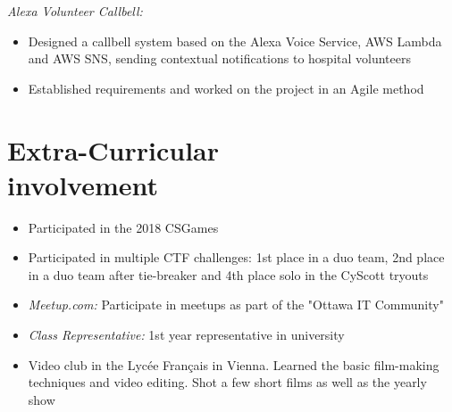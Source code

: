 \documentclass[margin, 10pt]{res} %
\begin{document}
\begin{resume}
{\sl Alexa Volunteer Callbell:}
\begin{itemize} \itemsep -2pt
\item Designed a callbell system based on the Alexa Voice Service, AWS Lambda and AWS SNS, sending contextual notifications to hospital volunteers
\item Established requirements and worked on the project in an Agile method
\end{itemize}







\section{Extra-Curricular \\ involvement}
\begin{itemize} \itemsep -2pt
\item Participated in the 2018 CSGames
\item Participated in multiple CTF challenges: 1st place in a duo team, 2nd place in a duo team after tie-breaker and 4th place solo in the CyScott tryouts
\item {\sl Meetup.com:} Participate in meetups as part of the "Ottawa IT Community"
\item {\sl Class Representative:} 1st year representative in university
\item Video club in the Lycée Français in Vienna. Learned the basic film-making techniques and video editing. Shot a few short films as well as the yearly show
\end{itemize}

\end{resume}
\end{document}
